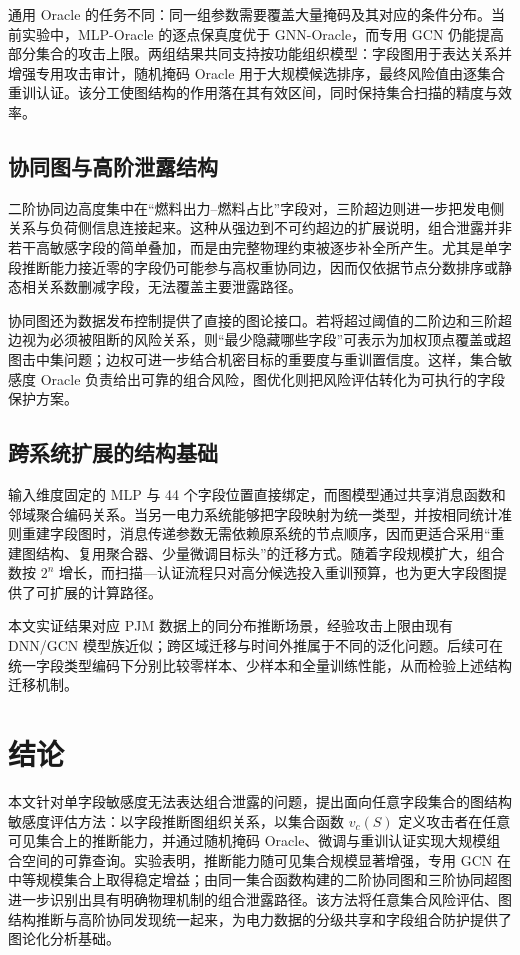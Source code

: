 \documentclass[UTF8,a4paper,zihao=5,fontset=fandol]{ctexart}
\begin{document}
通用 Oracle 的任务不同：同一组参数需要覆盖大量掩码及其对应的条件分布。当前实验中，MLP-Oracle 的逐点保真度优于 GNN-Oracle，而专用 GCN 仍能提高部分集合的攻击上限。两组结果共同支持按功能组织模型：字段图用于表达关系并增强专用攻击审计，随机掩码 Oracle 用于大规模候选排序，最终风险值由逐集合重训认证。该分工使图结构的作用落在其有效区间，同时保持集合扫描的精度与效率。

\subsection{协同图与高阶泄露结构}

二阶协同边高度集中在“燃料出力--燃料占比”字段对，三阶超边则进一步把发电侧关系与负荷侧信息连接起来。这种从强边到不可约超边的扩展说明，组合泄露并非若干高敏感字段的简单叠加，而是由完整物理约束被逐步补全所产生。尤其是单字段推断能力接近零的字段仍可能参与高权重协同边，因而仅依据节点分数排序或静态相关系数删减字段，无法覆盖主要泄露路径。

协同图还为数据发布控制提供了直接的图论接口。若将超过阈值的二阶边和三阶超边视为必须被阻断的风险关系，则“最少隐藏哪些字段”可表示为加权顶点覆盖或超图击中集问题；边权可进一步结合机密目标的重要度与重训置信度。这样，集合敏感度 Oracle 负责给出可靠的组合风险，图优化则把风险评估转化为可执行的字段保护方案。

\subsection{跨系统扩展的结构基础}

输入维度固定的 MLP 与 44 个字段位置直接绑定，而图模型通过共享消息函数和邻域聚合编码关系\citep{battaglia2018relational,hamilton2017graphsage}。当另一电力系统能够把字段映射为统一类型，并按相同统计准则重建字段图时，消息传递参数无需依赖原系统的节点顺序，因而更适合采用“重建图结构、复用聚合器、少量微调目标头”的迁移方式。随着字段规模扩大，组合数按 $2^n$ 增长，而扫描—认证流程只对高分候选投入重训预算，也为更大字段图提供了可扩展的计算路径。

本文实证结果对应 PJM 数据上的同分布推断场景，经验攻击上限由现有 DNN/GCN 模型族近似；跨区域迁移与时间外推属于不同的泛化问题。后续可在统一字段类型编码下分别比较零样本、少样本和全量训练性能，从而检验上述结构迁移机制。

\section{结论}

本文针对单字段敏感度无法表达组合泄露的问题，提出面向任意字段集合的图结构敏感度评估方法：以字段推断图组织关系，以集合函数 $v_c(S)$ 定义攻击者在任意可见集合上的推断能力，并通过随机掩码 Oracle、微调与重训认证实现大规模组合空间的可靠查询。实验表明，推断能力随可见集合规模显著增强，专用 GCN 在中等规模集合上取得稳定增益；由同一集合函数构建的二阶协同图和三阶协同超图进一步识别出具有明确物理机制的组合泄露路径。该方法将任意集合风险评估、图结构推断与高阶协同发现统一起来，为电力数据的分级共享和字段组合防护提供了图论化分析基础。
\end{document}
